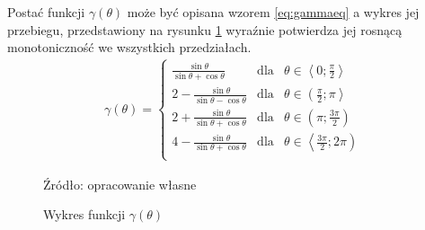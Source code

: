      Postać funkcji $\gamma\left(\theta\right)$ może być opisana wzorem \ref{eq:gammaeq} a wykres jej przebiegu, przedstawiony na rysunku \ref{fig:gamma} wyraźnie potwierdza jej rosnącą monotoniczność we wszystkich przedziałach.
        \begin{align}\label{eq:gammaeq}
        	\gamma\left(
        		\theta
        	\right) = 
        		\left\{
        			\begin{array}{lcl}
        				\frac{
        					\sin\theta
        				}{
							\sin\theta + \cos\theta        			
        				} & 
        					\text{dla} &
        					\theta \in \left\langle
        						0;
        						\frac{
        							\pi
        						}{
									2        						
        						}
        					\right\rangle\\
        				2
        				- \frac{
        					\sin\theta
        				}{
							\sin\theta - \cos\theta        			
        				} & 
        					\text{dla} &
        					\theta \in \left(
        						\frac{
        							\pi
        						}{
									2        						
        						};
        						\pi
        					\right\rangle\\
        				2
        				+ \frac{
        					\sin\theta
        				}{
							\sin\theta + \cos\theta        			
        				} & 
        					\text{dla} &
        					\theta \in \left(
        						\pi;
        						\frac{
        							3\pi
        						}{
									2        						
        						}
        					\right)\\
        				4
        				- \frac{
        					\sin\theta
        				}{
							\sin\theta + \cos\theta        			
        				} & 
        					\text{dla} &
        					\theta \in \left\langle
        						\frac{
        							3\pi
        						}{
									2        						
        						};
        						2\pi
        					\right)\\
        			\end{array}
        		\right.      		
        \end{align}
        \begin{figure}[h!]
        	\begin{center}
    			
    			\caption{Wykres funkcji $\gamma\left(\theta\right)$ }\label{fig:gamma}
    			
    			Źródło: opracowanie własne
    	\end{center}
    	\end{figure}\vspace{-8 mm}\\
       
